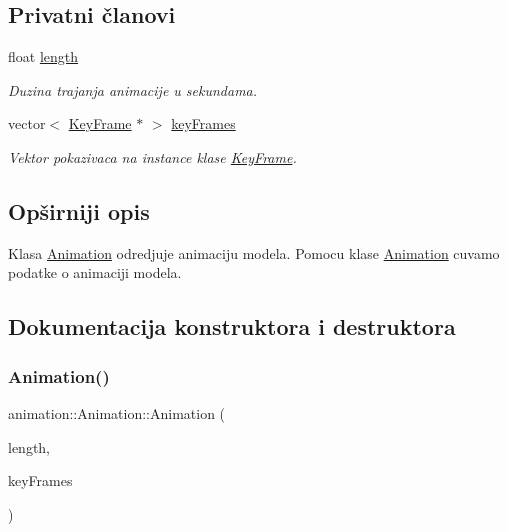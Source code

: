 \subsection*{Privatni članovi}
\begin{DoxyCompactItemize}
\item 
float \hyperlink{classanimation_1_1Animation_a2e08946f67829d6907b204f70d94a6ec}{length}
\begin{DoxyCompactList}\small\item\em Duzina trajanja animacije u sekundama. \end{DoxyCompactList}\item 
vector$<$ \hyperlink{classanimation_1_1KeyFrame}{Key\+Frame} $\ast$ $>$ \hyperlink{classanimation_1_1Animation_a371ea96eed842fd75e5c36cc757c232d}{key\+Frames}
\begin{DoxyCompactList}\small\item\em Vektor pokazivaca na instance klase \hyperlink{classanimation_1_1KeyFrame}{Key\+Frame}. \end{DoxyCompactList}\end{DoxyCompactItemize}


\subsection{Opširniji opis}
Klasa \hyperlink{classanimation_1_1Animation}{Animation} odredjuje animaciju modela. Pomocu klase \hyperlink{classanimation_1_1Animation}{Animation} cuvamo podatke o animaciji modela. 

\subsection{Dokumentacija konstruktora i destruktora}
\mbox{\label{classanimation_1_1Animation_a82667067e10341fa3843e5a61badec1c}} 
\subsubsection{\texorpdfstring{Animation()}{Animation()}}
{\footnotesize\ttfamily animation\+::\+Animation\+::\+Animation (\begin{DoxyParamCaption}\item[{float}]{length,  }\item[{vector$<$ \hyperlink{classanimation_1_1KeyFrame}{Key\+Frame} $\ast$$>$}]{key\+Frames }\end{DoxyParamCaption})}



